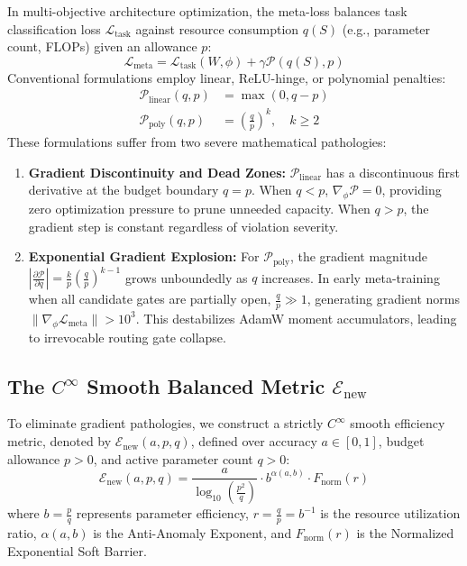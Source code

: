 \documentclass[11pt, a4paper]{article}
\begin{document}
In multi-objective architecture optimization, the meta-loss balances task classification loss $\mathcal{L}_{\text{task}}$ against resource consumption $q(S)$ (e.g., parameter count, FLOPs) given an allowance $p$:
\begin{equation}
    \mathcal{L}_{\text{meta}} = \mathcal{L}_{\text{task}}(W, \phi) + \gamma \mathcal{P}(q(S), p)
    \label{eq:meta_loss}
\end{equation}
Conventional formulations employ linear, ReLU-hinge, or polynomial penalties:
\begin{align}
    \mathcal{P}_{\text{linear}}(q, p) &= \max(0, q - p) \\
    \mathcal{P}_{\text{poly}}(q, p) &= \left(\frac{q}{p}\right)^k, \quad k \ge 2
\end{align}
These formulations suffer from two severe mathematical pathologies:
\begin{enumerate}
    \item \textbf{Gradient Discontinuity and Dead Zones:} $\mathcal{P}_{\text{linear}}$ has a discontinuous first derivative at the budget boundary $q = p$. When $q < p$, $\nabla_\phi \mathcal{P} = 0$, providing zero optimization pressure to prune unneeded capacity. When $q > p$, the gradient step is constant regardless of violation severity.
    \item \textbf{Exponential Gradient Explosion:} For $\mathcal{P}_{\text{poly}}$, the gradient magnitude $\left|\frac{\partial \mathcal{P}}{\partial q}\right| = \frac{k}{p} \left(\frac{q}{p}\right)^{k-1}$ grows unboundedly as $q$ increases. In early meta-training when all candidate gates are partially open, $\frac{q}{p} \gg 1$, generating gradient norms $\|\nabla_\phi \mathcal{L}_{\text{meta}}\| > 10^3$. This destabilizes AdamW moment accumulators, leading to irrevocable routing gate collapse.
\end{enumerate}

\subsection{The $C^\infty$ Smooth Balanced Metric $\mathcal{E}_{\text{new}}$}
\label{sec:enew}

To eliminate gradient pathologies, we construct a strictly $C^\infty$ smooth efficiency metric, denoted by $\mathcal{E}_{\text{new}}(a, p, q)$, defined over accuracy $a \in [0, 1]$, budget allowance $p > 0$, and active parameter count $q > 0$:
\begin{equation}
    \mathcal{E}_{\text{new}}(a, p, q) = \frac{a}{\log_{10}\left(\frac{p^2}{q}\right)} \cdot b^{\alpha(a, b)} \cdot F_{\text{norm}}(r)
    \label{eq:efficiency}
\end{equation}
where $b = \frac{p}{q}$ represents parameter efficiency, $r = \frac{q}{p} = b^{-1}$ is the resource utilization ratio, $\alpha(a, b)$ is the Anti-Anomaly Exponent, and $F_{\text{norm}}(r)$ is the Normalized Exponential Soft Barrier.
\end{document}
